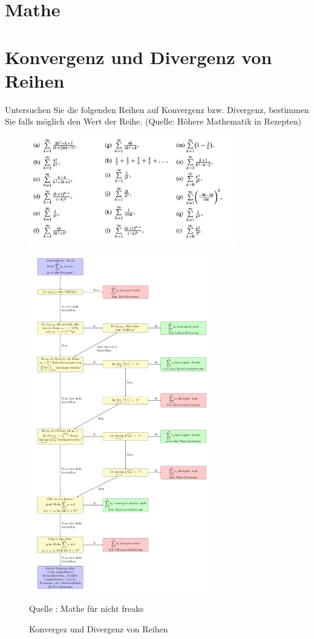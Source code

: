 \documentclass[addpoints,12pt]{exam} %
\begin{document}
\author{Shah Rrks}
\section*{Mathe}
\section*{Konvergenz und Divergenz von Reihen}
\begin{questions}
\question Untersuchen Sie die folgenden Reihen auf Konvergenz bzw. Divergenz, bestimmen
Sie falls möglich den Wert der Reihe. (Quelle: Höhere Mathematik in Rezepten)

\begin{figure}[h]
    \centering
    \includegraphics[width=0.8\textwidth]{auf1.png}
\end{figure}

\end{questions}



\begin{figure}[h]
\centering
\includegraphics[width=0.7\textwidth]{algorithm.png}
\caption{Konvergez und Divergenz von Reihen}
\label{fig:Konvergez und Divergenz von Reihen}
Quelle : Mathe für nicht freaks 

\end{figure}
\end{document}
